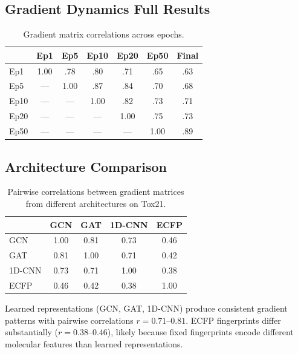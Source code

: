 \documentclass[sigconf,nonacm]{acmart}
\begin{document}
\subsection{Gradient Dynamics Full Results}
\begin{table}[H]
\caption{Gradient matrix correlations across epochs.}
\begin{center}
\begin{small}
\begin{tabular}{lcccccc}
\toprule
 & Ep1 & Ep5 & Ep10 & Ep20 & Ep50 & Final \\
\midrule
Ep1 & 1.00 & .78 & .80 & .71 & .65 & .63 \\
Ep5 & --- & 1.00 & .87 & .84 & .70 & .68 \\
Ep10 & --- & --- & 1.00 & .82 & .73 & .71 \\
Ep20 & --- & --- & --- & 1.00 & .75 & .73 \\
Ep50 & --- & --- & --- & --- & 1.00 & .89 \\
\bottomrule
\end{tabular}
\end{small}
\end{center}
\end{table}
\subsection{Architecture Comparison}
\begin{table}[H]
\caption{Pairwise correlations between gradient matrices from different architectures on Tox21.}
\begin{center}
\begin{tabular}{lcccc}
\toprule
 & GCN & GAT & 1D-CNN & ECFP \\
\midrule
GCN & 1.00 & 0.81 & 0.73 & 0.46 \\
GAT & 0.81 & 1.00 & 0.71 & 0.42 \\
1D-CNN & 0.73 & 0.71 & 1.00 & 0.38 \\
ECFP & 0.46 & 0.42 & 0.38 & 1.00 \\
\bottomrule
\end{tabular}
\end{center}
\end{table}
Learned representations (GCN, GAT, 1D-CNN) produce consistent gradient patterns with pairwise correlations $r = 0.71$--$0.81$. ECFP fingerprints differ substantially ($r = 0.38$--$0.46$), likely because fixed fingerprints encode different molecular features than learned representations.
\end{document}
